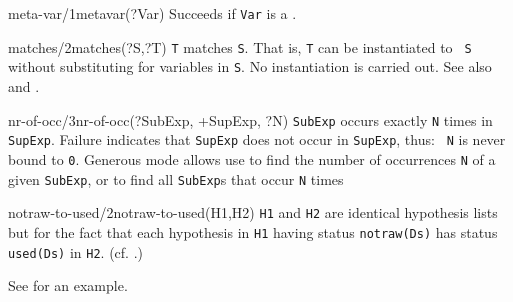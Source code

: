 \begin{predicate}{meta-var/1}{metavar(?Var)}%
Succeeds if {\tt Var} is a .
\end{predicate}

\iffalse
\begin{predicate}{minimal/2}{minimal(?+Schemes,Scheme)}%
{\tt Scheme}\inxx{subsumption} is an induction scheme which is a
minimal member of {\tt Schemes}, that is: no other member of {\tt
Schemes} is subsumed by {\tt Scheme}. For example:
\begin{verbatim}
:- minimal([s(x),times(x,y)],S).
S = s(x) ;

S = times(x,y) ;

no
:- minimal([s(x),s(s(x)),times(x,y)],S).
S = s(x) ;
S = times(x,y) ;
no
\end{verbatim}
\end{predicate}
\fi

\iffalse
\begin{predicate}{minimally-subsumes/2}{minimally-subsumes(?Scheme,+Schemes)}%
\inxx{subsumption}{\tt Scheme} is the minimal {\tt Scheme} which
subsumes all members of {\tt Schemes}. That is: there is no other
scheme which also subsumes all members of {\tt Schemes} but is itself
subsumed by {\tt Scheme}.
\end{predicate}
\fi

\begin{predicate}{matches/2}{matches(?S,?T)}%
{\tt T} matches {\tt S}.  That is, {\tt T} can be instantiated to {\tt
S} without substituting for variables in {\tt S}.  No instantiation is
carried out.  See also~ and .
\end{predicate}

\begin{predicate}{nr-of-occ/3}{nr-of-occ(?SubExp, +SupExp, ?N)}%
{\tt SubExp} occurs exactly {\tt N} times in {\tt SupExp}. Failure
indicates that {\tt SupExp} does not occur in {\tt SupExp}, thus: {\tt
N} is never bound to {\tt 0}. Generous mode allows use to find the
number of occurrences {\tt N} of a given {\tt SubExp}, or to find all
{\tt SubExp}s that occur {\tt N} times
\end{predicate}

\begin{predicate}{notraw-to-used/2}{notraw-to-used(H1,H2)}%
{\tt H1} and {\tt H2} are identical hypothesis lists but for the fact
that each hypothesis in {\tt H1} having status {\tt notraw(Ds)} has
status {\tt used(Ds)} in {\tt H2}.   (cf. .)

See  for an example.
\end{predicate}

